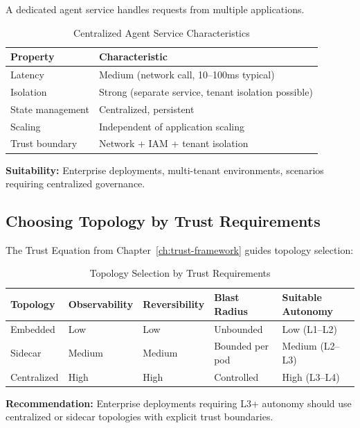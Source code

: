 A dedicated agent service handles requests from multiple applications.

\begin{table}[htbp]
\centering
\caption{Centralized Agent Service Characteristics}
\label{tab:centralized-topology}
\begin{tabular}{ll}
\toprule
\textbf{Property} & \textbf{Characteristic} \\
\midrule
Latency & Medium (network call, 10--100ms typical) \\
Isolation & Strong (separate service, tenant isolation possible) \\
State management & Centralized, persistent \\
Scaling & Independent of application scaling \\
Trust boundary & Network + IAM + tenant isolation \\
\bottomrule
\end{tabular}
\end{table}

\textbf{Suitability:} Enterprise deployments, multi-tenant environments, scenarios requiring centralized governance.

\subsection{Choosing Topology by Trust Requirements}
\label{subsec:topology-trust}

The Trust Equation from Chapter~\ref{ch:trust-framework} guides topology selection:

\begin{table}[htbp]
\centering
\caption{Topology Selection by Trust Requirements}
\label{tab:topology-trust}
\begin{tabular}{lllll}
\toprule
\textbf{Topology} & \textbf{Observability} & \textbf{Reversibility} & \textbf{Blast Radius} & \textbf{Suitable Autonomy} \\
\midrule
Embedded & Low & Low & Unbounded & Low (L1--L2) \\
Sidecar & Medium & Medium & Bounded per pod & Medium (L2--L3) \\
Centralized & High & High & Controlled & High (L3--L4) \\
\bottomrule
\end{tabular}
\end{table}

\textbf{Recommendation:} Enterprise deployments requiring L3+ autonomy should use centralized or sidecar topologies with explicit trust boundaries.

